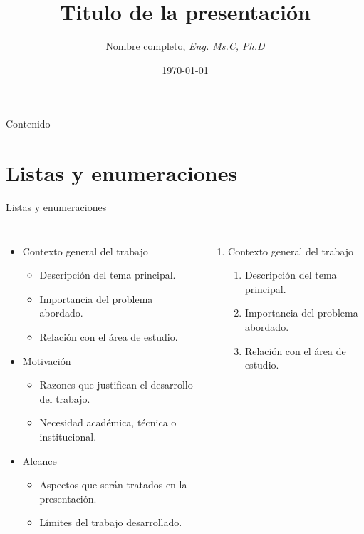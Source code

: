 \documentclass[11pt, aspectratio=169]{beamer}
\title{Titulo de la presentación}
\date[\today]{\today}
\author[Nombre Apellido]{Nombre completo\inst{1}, {\small \textit{Eng. Ms.C, Ph.D}}}
\institute{\inst{1}Universidad Surcolombiana}
\begin{document}
\begin{frame}
\titlepage
\end{frame}

\begin{frame}{Contenido}
    \tableofcontents
\end{frame}

\section{Listas y enumeraciones}
\begin{frame}{Listas y enumeraciones}
    \begin{columns}[onlytextwidth]
		\begin{itemize}
		    \item Contexto general del trabajo
		    \begin{itemize}
		        \item Descripción del tema principal.
		        \item Importancia del problema abordado.
		        \item Relación con el área de estudio.
		    \end{itemize}
		
		    \item Motivación
		    \begin{itemize}
		        \item Razones que justifican el desarrollo del trabajo.
		        \item Necesidad académica, técnica o institucional.
		    \end{itemize}
		
		    \item Alcance
		    \begin{itemize}
		        \item Aspectos que serán tratados en la presentación.
		        \item Límites del trabajo desarrollado.
		    \end{itemize}
		\end{itemize}
		\begin{enumerate}
		    \item Contexto general del trabajo
		    \begin{enumerate}
		        \item Descripción del tema principal.
		        \item Importancia del problema abordado.
		        \item Relación con el área de estudio.
		    \end{enumerate}
		

\end{enumerate}
\end{columns}
\end{frame}
\end{document}
